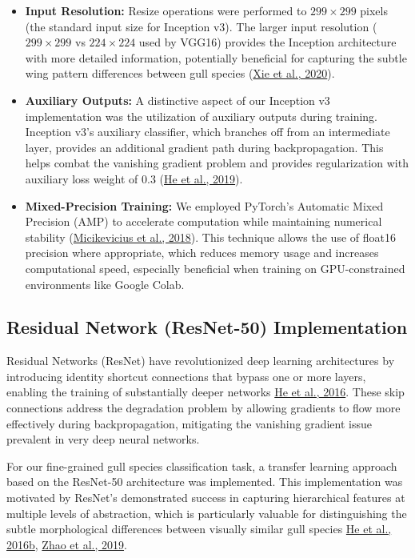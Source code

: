 \documentclass[a4paper,12pt]{article}
\begin{document}
\begin{itemize}
    \item \textbf{Input Resolution:} Resize operations were performed to $299\times299$ pixels (the standard input size for Inception v3). The larger input resolution ($299\times299$ vs $224\times224$ used by VGG16) provides the Inception architecture with more detailed information, potentially beneficial for capturing the subtle wing pattern differences between gull species (\href{https://arxiv.org/abs/1911.0907}{Xie et al., 2020}).
    
    \item \textbf{Auxiliary Outputs:} A distinctive aspect of our Inception v3 implementation was the utilization of auxiliary outputs during training. Inception v3's auxiliary classifier, which branches off from an intermediate layer, provides an additional gradient path during backpropagation. This helps combat the vanishing gradient problem and provides regularization with auxiliary loss weight of 0.3 (\href{https://arxiv.org/abs/1902.04103}{He et al., 2019}).
    
    \item \textbf{Mixed-Precision Training:} We employed PyTorch's Automatic Mixed Precision (AMP) to accelerate computation while maintaining numerical stability (\href{https://arxiv.org/abs/1710.03740}{Micikevicius et al., 2018}). This technique allows the use of float16 precision where appropriate, which reduces memory usage and increases computational speed, especially beneficial when training on GPU-constrained environments like Google Colab.
\end{itemize}

\subsection{Residual Network (ResNet-50) Implementation}

Residual Networks (ResNet) have revolutionized deep learning architectures by introducing identity shortcut connections that bypass one or more layers, enabling the training of substantially deeper networks {\href{https://arxiv.org/abs/1512.03385}{He et al., 2016}}. These skip connections address the degradation problem by allowing gradients to flow more effectively during backpropagation, mitigating the vanishing gradient issue prevalent in very deep neural networks.

For our fine-grained gull species classification task, a transfer learning approach based on the ResNet-50 architecture was implemented. This implementation was motivated by ResNet's demonstrated success in capturing hierarchical features at multiple levels of abstraction, which is particularly valuable for distinguishing the subtle morphological differences between visually similar gull species {\href{https://arxiv.org/abs/1603.05027}{He et al., 2016b}, \href{https://ieeexplore.ieee.org/document/8658831}{Zhao et al., 2019}}.
\end{document}
